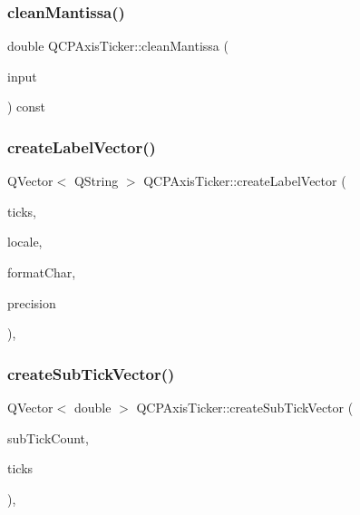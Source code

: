 \subsubsection{\texorpdfstring{cleanMantissa()}{cleanMantissa()}}
{\footnotesize\ttfamily double Q\+C\+P\+Axis\+Ticker\+::clean\+Mantissa (\begin{DoxyParamCaption}\item[{double}]{input }\end{DoxyParamCaption}) const\hspace{0.3cm}{\ttfamily [protected]}}

\mbox{\label{class_q_c_p_axis_ticker_a804050e408f37a0b9770c6654ebe6aa7}} 
\subsubsection{\texorpdfstring{createLabelVector()}{createLabelVector()}}
{\footnotesize\ttfamily Q\+Vector$<$ Q\+String $>$ Q\+C\+P\+Axis\+Ticker\+::create\+Label\+Vector (\begin{DoxyParamCaption}\item[{const Q\+Vector$<$ double $>$ \&}]{ticks,  }\item[{const Q\+Locale \&}]{locale,  }\item[{Q\+Char}]{format\+Char,  }\item[{int}]{precision }\end{DoxyParamCaption})\hspace{0.3cm}{\ttfamily [protected]}, {\ttfamily [virtual]}}

\mbox{\label{class_q_c_p_axis_ticker_a9a6435723fa0bd366d1ea4c2cff7c33f}} 
\subsubsection{\texorpdfstring{createSubTickVector()}{createSubTickVector()}}
{\footnotesize\ttfamily Q\+Vector$<$ double $>$ Q\+C\+P\+Axis\+Ticker\+::create\+Sub\+Tick\+Vector (\begin{DoxyParamCaption}\item[{int}]{sub\+Tick\+Count,  }\item[{const Q\+Vector$<$ double $>$ \&}]{ticks }\end{DoxyParamCaption})\hspace{0.3cm}{\ttfamily [protected]}, {\ttfamily [virtual]}}

